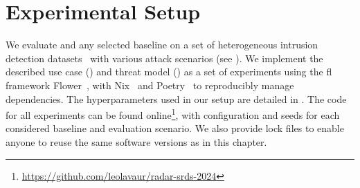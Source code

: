 \section{Experimental Setup\label{sec:radar.methodo}}

We evaluate \thecontrib and any selected baseline on a set of heterogeneous intrusion detection datasets~\cite{sarhan_StandardFeatureSet_2022} with various attack scenarios (see ).
We implement the described use case () and threat model () as a set of experiments using the \gls{fl} framework Flower~\cite{beutel_Flowerfriendlyfederated_2020}, with Nix~\cite{dolstra_purelyfunctionalsoftware_2006} and Poetry~\cite{eustace_Pythondependencymanagement_2018} to reproducibly manage dependencies.
The hyperparameters used in our setup are detailed in .
The code for all experiments can be found online\footnote{\url{https://github.com/leolavaur/radar-srds-2024}}, with configuration and seeds for each considered baseline and evaluation scenario. 
We also provide lock files to enable anyone to reuse the same software versions as in this chapter.

